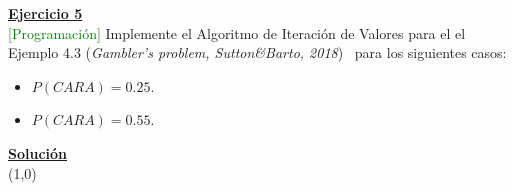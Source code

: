 \indent\underline{\textbf{Ejercicio 5}}\\
\textcolor{green}{[Programación]} Implemente el Algoritmo de Iteración de Valores para el el Ejemplo 4.3 (\textit{Gambler’s problem, Sutton\&Barto, 2018})~\cite{Sutton2018} para los siguientes casos:

\begin{itemize}
    \item $P(CARA) = 0.25$.
    \item $P(CARA) = 0.55$.
\end{itemize}

\indent\underline{\textbf{Solución}}\\

\line(1,0){\textwidth}
